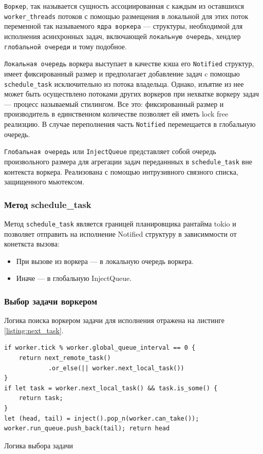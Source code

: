 \verb|Воркер|, так называется сущность ассоциированная с каждым из оставшихся \verb|worker_threads| потоков с помощью размещения в локальной для этих поток переменной так называемого \verb|ядра воркера| --- структуры, необходимой для исполнения асинхронных задач, включающей \verb|локальную очередь|, хендлер \verb|глобальной очереди| и тому подобное.

\verb|Локальная очередь| воркера выступает в качестве кэша его \verb|Notified| структур, имеет фиксированный размер и предполагает добавление задач c помощью \verb|schedule_task| исключительно из потока владельца. Однако, изъятие из нее может быть осуществлено потоками других воркеров при нехватке воркеру задач --- процесс называемый стилингом. Все это: фиксированный размер и производитель в единственном количестве позволяет ей иметь lock free реализцию. В случае переполнения часть \verb|Notified| перемещается в глобальную очередь.

\verb|Глобальная очередь| или \verb|InjectQueue| представляет собой очередь произвольного размера для агрегации задач переданнных в \verb|schedule_task| вне контекста воркера. Реализована с помощью интрузивного связного списка, защищенного мьютексом.

\subsubsection{Метод schedule\_task}

Метод \verb|schedule_task| является границей планировщика рантайма tokio и позволяет отправить на исполнение Notified структуру в зависиммости от конеткста вызова:

\begin{itemize}
    \item При вызове из воркера --- в локальную очередь воркера.
    \item Иначе --- в глобальную InjectQueue.
\end{itemize}

\subsubsection{Выбор задачи воркером}

Логика поиска воркером задачи для исполнения отражена на листинге \ref{listing:next_task}.

\begin{listing}[H]
    \begin{verbatim}
if worker.tick % worker.global_queue_interval == 0 {
    return next_remote_task()
            .or_else(|| worker.next_local_task())
}
if let task = worker.next_local_task() && task.is_some() {
    return task;
}
let (head, tail) = inject().pop_n(worker.can_take());
worker.run_queue.push_back(tail); return head
    \end{verbatim}

    \caption{Логика выбора задачи}
    \label{listing:next_task}
\end{listing}

